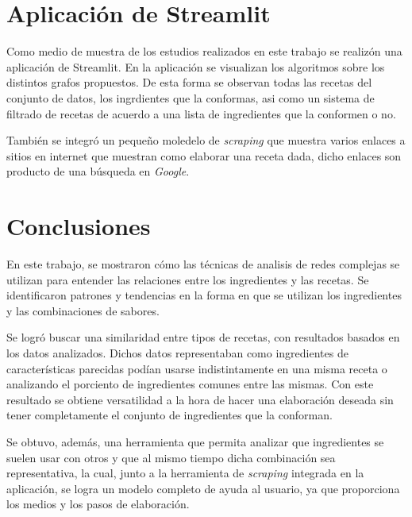 \documentclass[a4paper]{article}
\begin{document}
\section{Aplicación de Streamlit}\label{sec:app}

Como medio de muestra de los estudios realizados en este trabajo se realizón
una aplicación de Streamlit. En la aplicación se visualizan los algoritmos sobre
los distintos grafos propuestos. De esta forma se observan todas las recetas del
conjunto de datos, los ingrdientes que la conformas, asi como un sistema de
filtrado de recetas de acuerdo a una lista de ingredientes que la conformen o no.

También se integró un pequeño moledelo de \emph{scraping} que muestra varios
enlaces a sitios en internet que muestran como elaborar una receta dada, dicho
enlaces son producto de una búsqueda en \emph{Google}.

\section{Conclusiones}\label{sec:conc}

En este trabajo, se mostraron cómo las técnicas de analisis de redes complejas
se utilizan para entender las relaciones entre los ingredientes y las recetas.
Se identificaron patrones y tendencias en la forma en que se utilizan los
ingredientes y las combinaciones de sabores.

Se logró buscar una similaridad entre tipos de recetas, con resultados
basados en los datos analizados. Dichos datos representaban como ingredientes de
características parecidas podían usarse indistintamente en una misma receta o
analizando el porciento de ingredientes comunes entre las mismas. Con este
resultado se obtiene versatilidad a la hora de hacer una elaboración deseada sin
tener completamente el conjunto de ingredientes que la conforman.

Se obtuvo, además, una herramienta que permita analizar que ingredientes se
suelen usar con otros y que al mismo tiempo dicha combinación sea representativa,
la cual, junto a la herramienta de \emph{scraping} integrada en la aplicación,
se logra un modelo completo de ayuda al usuario, ya que proporciona los medios
y los pasos de elaboración.
\end{document}
